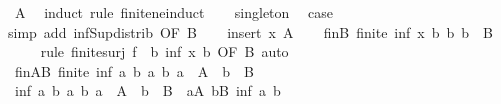 \begin{isabellebody}
%
\isadelimproof
%
\endisadelimproof
%
\isatagproof
{}\isamarkupfalse%
\ A\ \isamarkupfalse%
\ {\isacharparenleft}{\kern0pt}induct\ rule{\isacharcolon}{\kern0pt}\ finite{\isacharunderscore}{\kern0pt}ne{\isacharunderscore}{\kern0pt}induct{\isacharparenright}{\kern0pt}\isanewline
\ \ \isamarkupfalse%
\ singleton\ \isamarkupfalse%
\ {\isacharquery}{\kern0pt}case\isanewline
\ \ \ \ \isamarkupfalse%
{\isacharparenleft}{\kern0pt}simp\ add{\isacharcolon}{\kern0pt}\ inf{\isacharunderscore}{\kern0pt}Sup{}{\isacharunderscore}{\kern0pt}distrib\ {\isacharbrackleft}{\kern0pt}OF\ B{\isacharbrackright}{\kern0pt}{\isacharparenright}{\kern0pt}\isanewline
{}\isamarkupfalse%
\isanewline
\ \ \isamarkupfalse%
\ {\isacharparenleft}{\kern0pt}insert\ x\ A{\isacharparenright}{\kern0pt}\isanewline
\ \ \isamarkupfalse%
\ finB{\isacharcolon}{\kern0pt}\ {\isachardoublequoteopen}finite\ {\isacharbraceleft}{\kern0pt}inf\ x\ b\ {\isacharbar}{\kern0pt}b{\isachardot}{\kern0pt}\ b\ {\isasymin}\ B{\isacharbraceright}{\kern0pt}{\isachardoublequoteclose}\isanewline
\ \ \ \ \isamarkupfalse%
{\isacharparenleft}{\kern0pt}rule\ finite{\isacharunderscore}{\kern0pt}surj{\isacharbrackleft}{\kern0pt}\ f\ {\isacharequal}{\kern0pt}\ {\isachardoublequoteopen}{\isacharpercent}{\kern0pt}b{\isachardot}{\kern0pt}\ inf\ x\ b{\isachardoublequoteclose}{\isacharcomma}{\kern0pt}\ OF\ B{\isacharparenleft}{\kern0pt}{}{\isacharparenright}{\kern0pt}{\isacharbrackright}{\kern0pt}{\isacharcomma}{\kern0pt}\ auto{\isacharparenright}{\kern0pt}\isanewline
\ \ \isamarkupfalse%
\ finAB{\isacharcolon}{\kern0pt}\ {\isachardoublequoteopen}finite\ {\isacharbraceleft}{\kern0pt}inf\ a\ b\ {\isacharbar}{\kern0pt}a\ b{\isachardot}{\kern0pt}\ a\ {\isasymin}\ A\ {\isasymand}\ b\ {\isasymin}\ B{\isacharbraceright}{\kern0pt}{\isachardoublequoteclose}\isanewline
\ \ \isamarkupfalse%
\ {\isacharminus}{\kern0pt}\isanewline
\ \ \ \ \isamarkupfalse%
\ {\isachardoublequoteopen}{\isacharbraceleft}{\kern0pt}inf\ a\ b\ {\isacharbar}{\kern0pt}a\ b{\isachardot}{\kern0pt}\ a\ {\isasymin}\ A\ {\isasymand}\ b\ {\isasymin}\ B{\isacharbraceright}{\kern0pt}\ {\isacharequal}{\kern0pt}\ {\isacharparenleft}{\kern0pt}{\isasymUnion}a{\isasymin}A{\isachardot}{\kern0pt}\ {\isasymUnion}b{\isasymin}B{\isachardot}{\kern0pt}\ {\isacharbraceleft}{\kern0pt}inf\ a\ b{\isacharbraceright}{\kern0pt}{\isacharparenright}{\kern0pt}{\isachardoublequoteclose}\isanewline

\end{isabellebody}
